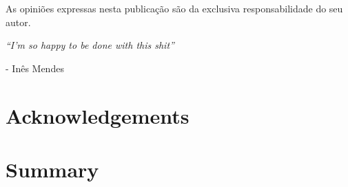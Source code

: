 \documentclass[12pt,a4paper,twoside,openright]{book}
\def\blankpage{%
      \clearpage%
      \thispagestyle{empty}%
      \null%
      \clearpage}
\begin{document}
\begin{sloppy}
\frontmatter


\clearpage \thispagestyle{empty}\mbox{}\clearpage


\clearpage \thispagestyle{empty}\mbox{}\clearpage

\newpage
\thispagestyle{empty}
\vspace*{\fill}
As opiniões expressas nesta publicação são da exclusiva responsabilidade do seu autor.
\blankpage

\newpage
\thispagestyle{empty}
\vspace*{3cm}
\begin{center}
\emph{``I'm so happy to be done with this shit''} \\
\end{center} 
\begin{flushright}- Inês Mendes\end{flushright}
\clearpage \thispagestyle{empty}\mbox{}\clearpage


\newpage
\thispagestyle{plain}
\chapter*{Acknowledgements}
\clearpage \thispagestyle{empty}\mbox{}\clearpage

\newpage
\thispagestyle{plain}
\chapter*{Summary}


\end{sloppy}
\end{document}
